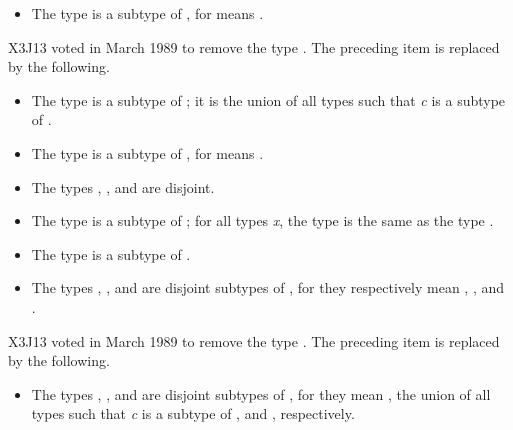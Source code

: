 \begin{obsolete}
\begin{itemize}
\item
The type  is a subtype of , for 
means .
\end{itemize}
\end{obsolete}

\newpage%
\begin{newer}
X3J13 voted in March 1989  to remove the type .
The preceding item is replaced by the following.
\begin{itemize}
\item
The type  is a subtype of ; it is the union of
all types  such that {\it c} is a subtype of .
\end{itemize}
\end{newer}

\begin{itemize}
\item
The type  is a subtype of , for 
means .

\item
The types , , and  are disjoint.

\item
The type  is a subtype of ; for all types {\it x},
the type  is the same as the type .

\item
The type  is a subtype of .
\end{itemize}

\begin{obsolete}
\begin{itemize}
\item
The types , , and
 are disjoint subtypes of , for they
respectively mean , ,
and .
\end{itemize}
\end{obsolete}

\begin{newer}
X3J13 voted in March 1989  to remove the type .
The preceding item is replaced by the following.
\begin{itemize}
\item
The types , , and
 are disjoint subtypes of , for they
mean , the union of all types
 such that {\it c} is a subtype of ,
and , respectively.
\end{itemize}
\end{newer}

